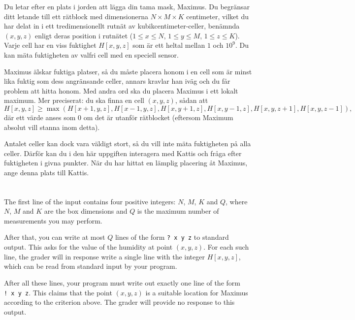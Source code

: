 \ifx\boi\undefined\fi
\def\version{jury-1}

Du letar efter en plats i jorden att lägga din tama mask, Maximus. Du begränsar ditt letande till ett rätblock med dimensionerna $N \times M \times K$ centimeter, vilket du har delat in i ett tredimensionellt rutnät av kubikcentimeter-celler, benämnda $(x,y,z)$ enligt deras position i rutnätet ($1 \le x \le N$, $1 \le y \le M$, $1 \le z \le K$). Varje cell har en viss fuktighet $H[x,y,z]$ som är ett heltal mellan $1$ och $10^9$. Du kan mäta fuktigheten av valfri cell med en speciell sensor.

Maximus älskar fuktiga platser, så du måste placera honom i en cell som är minst lika fuktig som dess angränsande celler, annars kravlar han iväg och du får problem att hitta honom. Med andra ord ska du placera Maximus i ett lokalt maximum.
Mer preciserat: du ska finna en cell $(x,y,z)$, sådan att
$$
H[x,y,z] \ge \max(H[x+1,y,z], H[x-1,y,z], H[x,y+1,z], H[x,y-1,z], H[x,y,z+1], H[x,y,z-1]),
$$
där ett värde anses som $0$ om det är utanför rätblocket (eftersom Maximum absolut vill stanna inom detta).

Antalet celler kan dock vara väldigt stort, så du vill inte mäta fuktigheten på alla celler. Därför kan du i den här uppgiften interagera med Kattis och fråga efter fuktigheten i givna punkter. När du har hittat en lämplig placering åt Maximus, ange denna plats till Kattis.

\section*{\interactivity}
The first line of the input contains four positive integers: $N$, $M$, $K$ and $Q$, where $N$, $M$ and $K$ are the box dimensions and $Q$ is the maximum number of measurements you may perform.

After that, you can write at most $Q$ lines of the form \texttt{?\ x y z} to standard output.
This asks for the value of the humidity at point $(x, y, z)$.
For each such line, the grader will in response write a single line with the integer $H[x,y,z]$, which can be read from standard input by your program.

After all these lines, your program must write out exactly one line of the form \texttt{!\ x y z}.
This claims that the point $(x, y, z)$ is a suitable location for Maximus according to the criterion above.
The grader will provide no response to this output.

